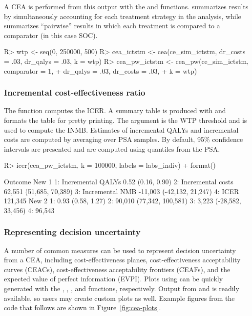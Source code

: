\documentclass[article, nojss]{jss}\usepackage[]{graphicx}\usepackage[]{color}
\begin{document}
A CEA is performed from this output with the  and  functions.  summarizes results by simultaneously accounting for each treatment strategy in the analysis, while  summarizes ``pairwise'' results in which each treatment is compared to a comparator (in this case SOC). 

\begin{Schunk}
\begin{Sinput}
R> wtp <- seq(0, 250000, 500) 
R> cea_ictstm <- cea(ce_sim_ictstm, dr_costs = .03, dr_qalys = .03, k = wtp)
R> cea_pw_ictstm <- cea_pw(ce_sim_ictstm, comparator = 1,
+                          dr_qalys = .03, dr_costs = .03,
+                          k = wtp)
\end{Sinput}
\end{Schunk}

\subsubsection{Incremental cost-effectiveness ratio}
The  function computes the ICER. A summary table is produced with  and  formats the table for pretty printing. The argument  is the WTP threshold and is used to compute the INMB. Estimates of incremental QALYs and incremental costs are computed by averaging over PSA samples. By default, 95\% confidence intervals are presented and are computed using quantiles from the PSA.

\begin{Schunk}
\begin{Sinput}
R> icer(cea_pw_ictstm, k = 100000, labels = labs_indiv) %
+    format()
\end{Sinput}
\begin{Soutput}
             Outcome                     New 1
1: Incremental QALYs         0.52 (0.16, 0.90)
2: Incremental costs   62,551 (51,685, 70,389)
3:   Incremental NMB -11,003 (-42,132, 21,247)
4:              ICER                   121,345
                      New 2
1:        0.93 (0.58, 1.27)
2: 90,010 (77,342, 100,581)
3:  3,223 (-28,582, 33,456)
4:                   96,543
\end{Soutput}
\end{Schunk}

\subsubsection{Representing decision uncertainty}
A number of common measures can be used to represent decision uncertainty from a CEA, including cost-effectiveness planes, cost-effectiveness acceptability curves (CEACs), cost-effectiveness acceptability frontiers (CEAFs), and the expected value of perfect information (EVPI). Plots using  can be quickly generated with the , , , and  functions, respectively. Output from  and  is readily available, so users may create custom plots as well. Example figures from the code that follows are shown in Figure~\ref{fig:cea-plots}.
\end{document}

